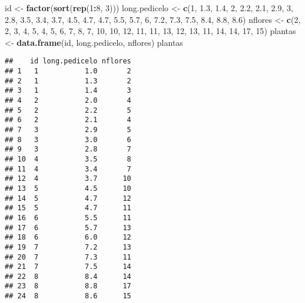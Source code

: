 \documentclass[
]{book}
\newenvironment{Shaded}{\begin{snugshade}}{\end{snugshade}}
\newcommand{\DecValTok}[1]{\textcolor[rgb]{0.00,0.00,0.81}{#1}}
\newcommand{\FloatTok}[1]{\textcolor[rgb]{0.00,0.00,0.81}{#1}}
\newcommand{\KeywordTok}[1]{\textcolor[rgb]{0.13,0.29,0.53}{\textbf{#1}}}
\newcommand{\NormalTok}[1]{#1}
\newcommand{\OperatorTok}[1]{\textcolor[rgb]{0.81,0.36,0.00}{\textbf{#1}}}
\newcommand{\StringTok}[1]{\textcolor[rgb]{0.31,0.60,0.02}{#1}}
\begin{document}
\begin{Shaded}
\begin{Highlighting}[]
\NormalTok{id <-}\StringTok{ }\KeywordTok{factor}\NormalTok{(}\KeywordTok{sort}\NormalTok{(}\KeywordTok{rep}\NormalTok{(}\DecValTok{1}\OperatorTok{:}\DecValTok{8}\NormalTok{, }\DecValTok{3}\NormalTok{)))}
\NormalTok{long.pedicelo <-}\StringTok{ }\KeywordTok{c}\NormalTok{(}\DecValTok{1}\NormalTok{, }\FloatTok{1.3}\NormalTok{, }\FloatTok{1.4}\NormalTok{, }\DecValTok{2}\NormalTok{, }\FloatTok{2.2}\NormalTok{, }\FloatTok{2.1}\NormalTok{, }\FloatTok{2.9}\NormalTok{, }\DecValTok{3}\NormalTok{, }\FloatTok{2.8}\NormalTok{, }\FloatTok{3.5}\NormalTok{, }\FloatTok{3.4}\NormalTok{, }\FloatTok{3.7}\NormalTok{,}
                   \FloatTok{4.5}\NormalTok{, }\FloatTok{4.7}\NormalTok{, }\FloatTok{4.7}\NormalTok{, }\FloatTok{5.5}\NormalTok{, }\FloatTok{5.7}\NormalTok{, }\DecValTok{6}\NormalTok{, }\FloatTok{7.2}\NormalTok{, }\FloatTok{7.3}\NormalTok{, }\FloatTok{7.5}\NormalTok{, }\FloatTok{8.4}\NormalTok{, }\FloatTok{8.8}\NormalTok{, }\FloatTok{8.6}\NormalTok{)}
\NormalTok{nflores <-}\StringTok{ }\KeywordTok{c}\NormalTok{(}\DecValTok{2}\NormalTok{, }\DecValTok{2}\NormalTok{, }\DecValTok{3}\NormalTok{, }\DecValTok{4}\NormalTok{, }\DecValTok{5}\NormalTok{, }\DecValTok{4}\NormalTok{, }\DecValTok{5}\NormalTok{, }\DecValTok{6}\NormalTok{, }\DecValTok{7}\NormalTok{, }\DecValTok{8}\NormalTok{, }\DecValTok{7}\NormalTok{, }\DecValTok{10}\NormalTok{, }\DecValTok{10}\NormalTok{, }\DecValTok{12}\NormalTok{, }\DecValTok{11}\NormalTok{, }\DecValTok{11}\NormalTok{, }\DecValTok{13}\NormalTok{, }\DecValTok{12}\NormalTok{,}
             \DecValTok{13}\NormalTok{, }\DecValTok{11}\NormalTok{, }\DecValTok{14}\NormalTok{, }\DecValTok{14}\NormalTok{, }\DecValTok{17}\NormalTok{, }\DecValTok{15}\NormalTok{)}
\NormalTok{plantas <-}\StringTok{ }\KeywordTok{data.frame}\NormalTok{(id, long.pedicelo, nflores)}
\NormalTok{plantas}
\end{Highlighting}
\end{Shaded}

\begin{verbatim}
##    id long.pedicelo nflores
## 1   1           1.0       2
## 2   1           1.3       2
## 3   1           1.4       3
## 4   2           2.0       4
## 5   2           2.2       5
## 6   2           2.1       4
## 7   3           2.9       5
## 8   3           3.0       6
## 9   3           2.8       7
## 10  4           3.5       8
## 11  4           3.4       7
## 12  4           3.7      10
## 13  5           4.5      10
## 14  5           4.7      12
## 15  5           4.7      11
## 16  6           5.5      11
## 17  6           5.7      13
## 18  6           6.0      12
## 19  7           7.2      13
## 20  7           7.3      11
## 21  7           7.5      14
## 22  8           8.4      14
## 23  8           8.8      17
## 24  8           8.6      15
\end{verbatim}
\end{document}
